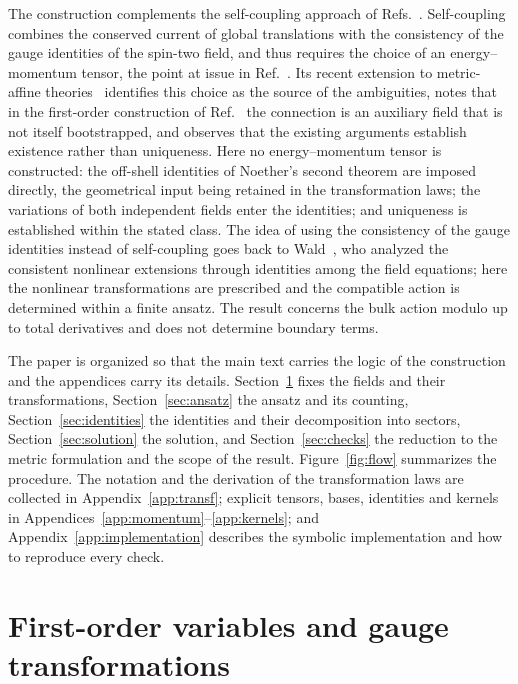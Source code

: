 \documentclass[prd,aps,preprint,superscriptaddress,nofootinbib,amsmath,amssymb,eqsecnum]{revtex4-2}
\providecommand{\DIFaddtex}[1]{{\protect\color{blue} \sf #1}} %
\providecommand{\DIFdeltex}[1]{{\protect\color{red} \scriptsize #1}} %
\providecommand{\DIFaddbegin}{} %
\providecommand{\DIFaddend}{} %
\providecommand{\DIFdelbegin}{} %
\providecommand{\DIFdelend}{} %
\providecommand{\DIFadd}[1]{\texorpdfstring{\DIFaddtex{#1}}{#1}} %
\providecommand{\DIFdel}[1]{\texorpdfstring{\DIFdeltex{#1}}{}} %
\begin{document}
The construction complements the self-coupling approach of
Refs.~\cite{Deser1970,Deser2010}. Self-coupling combines the conserved current of global
translations with the consistency of the gauge identities of the spin-two field, and thus
requires the choice of an energy--momentum tensor, the point at issue in
Ref.~\cite{Padmanabhan2008}. Its recent extension to metric-affine theories~\cite{Delhom2023}
identifies this choice as the source of the ambiguities, notes that in the first-order
construction of Ref.~\cite{Deser1970} the connection is an auxiliary field that is not itself
bootstrapped, and observes that the existing arguments establish existence rather than
uniqueness. Here no energy--momentum tensor is constructed: the off-shell identities of
Noether's second theorem are imposed directly, the geometrical input being retained in the
transformation laws; the variations of both independent fields enter the identities; and
uniqueness is established within the stated class. The idea of using the consistency of the
gauge identities instead of self-coupling goes back to Wald~\cite{Wald1986}, who analyzed the
consistent nonlinear extensions through identities among the field equations; here the
nonlinear transformations are prescribed and the compatible action is determined within a
finite ansatz. The result concerns the bulk action \DIFdelbegin \DIFdel{modulo }\DIFdelend \DIFaddbegin \DIFadd{up to }\DIFaddend total derivatives and does not
determine boundary terms.

The paper is organized so that the main text carries the logic of the construction and the
appendices carry its details. Section~\ref{sec:variables} fixes the fields and their
transformations, Section~\ref{sec:ansatz} the ansatz and its counting, Section~\ref{sec:identities}
the identities and their decomposition into sectors, Section~\ref{sec:solution} the solution,
and Section~\ref{sec:checks} the reduction to the metric formulation and the scope of the
result. Figure~\ref{fig:flow} summarizes the procedure. The notation and the derivation of the
transformation laws are collected in Appendix~\ref{app:transf}; explicit tensors, bases,
identities and kernels in Appendices~\ref{app:momentum}--\ref{app:kernels}; and
Appendix~\ref{app:implementation} describes the symbolic implementation and how to reproduce
every check.

\section{First-order variables and gauge transformations}
\label{sec:variables}
\end{document}
